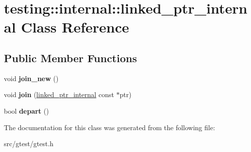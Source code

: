 \hypertarget{classtesting_1_1internal_1_1linked__ptr__internal}{}\section{testing\+:\+:internal\+:\+:linked\+\_\+ptr\+\_\+internal Class Reference}
\label{classtesting_1_1internal_1_1linked__ptr__internal}
\subsection*{Public Member Functions}
\begin{DoxyCompactItemize}
\item 
\mbox{\label{classtesting_1_1internal_1_1linked__ptr__internal_a742af1f65df2d5e2b7198a1b74264a83}} 
void {\bfseries join\+\_\+new} ()
\item 
\mbox{\label{classtesting_1_1internal_1_1linked__ptr__internal_a41918df82256ae6ab7a6888ed628dd0a}} 
void {\bfseries join} (\mbox{\hyperlink{classtesting_1_1internal_1_1linked__ptr__internal}{linked\+\_\+ptr\+\_\+internal}} const $\ast$ptr)
\item 
\mbox{\label{classtesting_1_1internal_1_1linked__ptr__internal_ab916efbc0c2776dacaa06222ea2e11e5}} 
bool {\bfseries depart} ()
\end{DoxyCompactItemize}


The documentation for this class was generated from the following file\+:\begin{DoxyCompactItemize}
\item 
src/gtest/gtest.\+h\end{DoxyCompactItemize}
